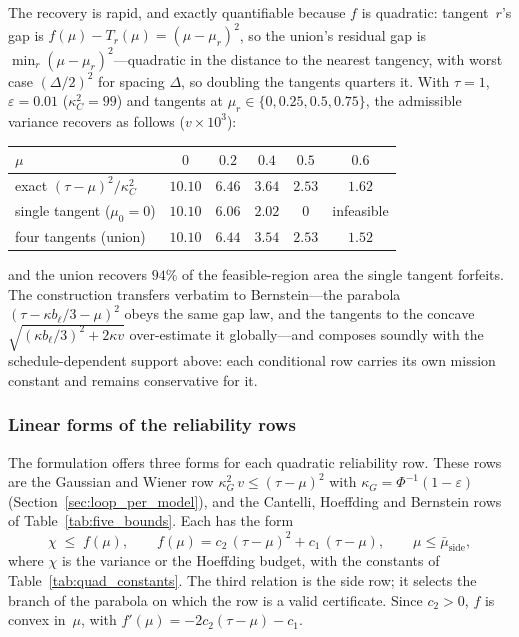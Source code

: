 \documentclass[11pt,a4paper]{article}
\theoremstyle{plain}
\theoremstyle{definition}
\theoremstyle{remark}
\begin{document}
The recovery is rapid, and exactly quantifiable because $f$ is quadratic: tangent~$r$'s gap is $f(\mu) - T_r(\mu) = (\mu - \mu_r)^2$, so the union's residual gap is $\min_r (\mu - \mu_r)^2$---quadratic in the distance to the nearest tangency, with worst case $(\Delta/2)^2$ for spacing $\Delta$, so doubling the tangents quarters it.
With $\tau = 1$, $\varepsilon = 0.01$ ($\kappa_C^2 = 99$) and tangents at $\mu_r \in \{0, 0.25, 0.5, 0.75\}$, the admissible variance recovers as follows ($v \times 10^{3}$):
\begin{center}
\footnotesize
\begin{tabular}{@{}lccccc@{}}
\toprule
$\mu$ & $0$ & $0.2$ & $0.4$ & $0.5$ & $0.6$ \\
\midrule
exact $(\tau-\mu)^2/\kappa_C^2$ & $10.10$ & $6.46$ & $3.64$ & $2.53$ & $1.62$ \\
single tangent ($\mu_0 = 0$)    & $10.10$ & $6.06$ & $2.02$ & $0$    & infeasible \\
four tangents (union)           & $10.10$ & $6.44$ & $3.54$ & $2.53$ & $1.52$ \\
\bottomrule
\end{tabular}
\end{center}
and the union recovers $94\%$ of the feasible-region area the single tangent forfeits.
The construction transfers verbatim to Bernstein---the parabola $(\tau - \kappa b_\ell/3 - \mu)^2$ obeys the same gap law, and the tangents to the concave $\sqrt{(\kappa b_\ell/3)^2 + 2\kappa v}$ over-estimate it globally---and composes soundly with the schedule-dependent support above: each conditional row carries its own mission constant and remains conservative for it.

\subsubsection{Linear forms of the reliability rows}
\label{sec:linear_forms}

The formulation offers three forms for each quadratic reliability row.
These rows are the Gaussian and Wiener row $\kappa_G^2\, v \le (\tau - \mu)^2$ with $\kappa_G = \Phi^{-1}(1-\varepsilon)$ (Section~\ref{sec:loop_per_model}), and the Cantelli, Hoeffding and Bernstein rows of Table~\ref{tab:five_bounds}.
Each has the form
\begin{equation}\label{eq:quad_row}
  \chi \;\le\; f(\mu), \qquad f(\mu) = c_2\,(\tau - \mu)^2 + c_1\,(\tau - \mu), \qquad \mu \le \bar\mu_{\mathrm{side}},
\end{equation}
where $\chi$ is the variance or the Hoeffding budget, with the constants of Table~\ref{tab:quad_constants}.
The third relation is the side row; it selects the branch of the parabola on which the row is a valid certificate.
Since $c_2 > 0$, $f$ is convex in~$\mu$, with $f'(\mu) = -2c_2(\tau - \mu) - c_1$.
\end{document}
